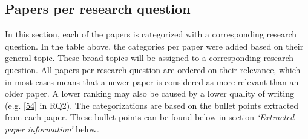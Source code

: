 \documentclass[]{book}
\begin{document}
\subsection{Papers per research
question}\label{papers-per-research-question}

In this section, each of the papers is categorized with a corresponding
research question. In the table above, the categories per paper were
added based on their general topic. These broad topics will be assigned
to a corresponding research question. All papers per research question
are ordered on their relevance, which in most cases means that a newer
paper is considered as more relevant than an older paper. A lower
ranking may also be caused by a lower quality of writing (e.g.
{[}\protect\hyperlink{ref-greiler2013}{54}{]} in RQ2). The
categorizations are based on the bullet points extracted from each
paper. These bullet points can be found below in section
\emph{`Extracted paper information'} below.
\end{document}
